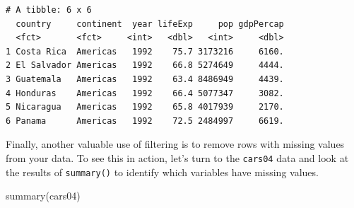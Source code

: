 \documentclass[
  letterpaper,
]{book}
\newenvironment{Shaded}{\begin{snugshade}}{\end{snugshade}}
\newcommand{\FunctionTok}[1]{\textcolor[rgb]{0.28,0.35,0.67}{#1}}
\newcommand{\NormalTok}[1]{\textcolor[rgb]{0.00,0.23,0.31}{#1}}
\begin{document}
\begin{verbatim}
# A tibble: 6 x 6
  country     continent  year lifeExp     pop gdpPercap
  <fct>       <fct>     <int>   <dbl>   <int>     <dbl>
1 Costa Rica  Americas   1992    75.7 3173216     6160.
2 El Salvador Americas   1992    66.8 5274649     4444.
3 Guatemala   Americas   1992    63.4 8486949     4439.
4 Honduras    Americas   1992    66.4 5077347     3082.
5 Nicaragua   Americas   1992    65.8 4017939     2170.
6 Panama      Americas   1992    72.5 2484997     6619.
\end{verbatim}

Finally, another valuable use of filtering is to remove rows with
missing values from your data. To see this in action, let's turn to the
\texttt{cars04} data and look at the results of \texttt{summary()} to
identify which variables have missing values.

\begin{Shaded}
\begin{Highlighting}[]
\FunctionTok{summary}\NormalTok{(cars04)}
\end{Highlighting}
\end{Shaded}
\end{document}
